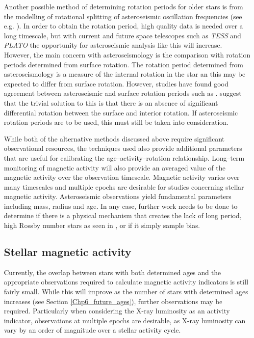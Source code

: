 Another possible method of determining rotation periods for older stars is from the modelling of rotational splitting of asteroseismic oscillation frequencies (see e.g. \citet{Davies_etal_2015}). In order to obtain the rotation period, high quality data is needed over a long timescale, but with current and future space telescopes such as \textit{TESS} and \textit{PLATO} the opportunity for asteroseismic analysis like this will increase. However, the main concern with asteroseismology is the comparison with rotation periods determined from surface rotation. The rotation period determined from asteroseismology is a measure of the internal rotation in the star an this may be expected to differ from surface rotation. However, studies have found good agreement between asteroseismic and surface rotation periods such as \citet{Chaplin_etal_2013,Gizon_etal_2013}. \citet{Davies_etal_2015} suggest that the trivial solution to this is that there is an absence of significant differential rotation between the surface and interior rotation. If asteroseismic rotation periods are to be used, this must still be taken into consideration.

While both of the alternative methods discussed above require significant observational resources, the techniques used also provide additional parameters that are useful for calibrating the age--activity--rotation relationship. Long--term monitoring of magnetic activity will also provide an averaged value of the magnetic activity over the observation timescale. Magnetic activity varies over many timescales and multiple epochs are desirable for studies concerning stellar magnetic activity. Asteroseismic observations yield fundamental parameters including mass, radius and age. In any case, further work needs to be done to determine if there is a physical mechanism that creates the lack of long period, high Rossby number stars as seen in \citet{van_Saders_etal_2019}, or if it simply sample bias.

\subsection{Stellar magnetic activity}

Currently, the overlap between stars with both determined ages and the appropriate observations required to calculate magnetic activity indicators is still fairly small. While this will improve as the number of stars with determined ages increases (see Section \ref{Chp6_future_ages}), further observations may be required. Particularly when considering the X-ray luminosity as an activity indicator, observations at multiple epochs are desirable, as X-ray luminosity can vary by an order of magnitude over a stellar activity cycle.

